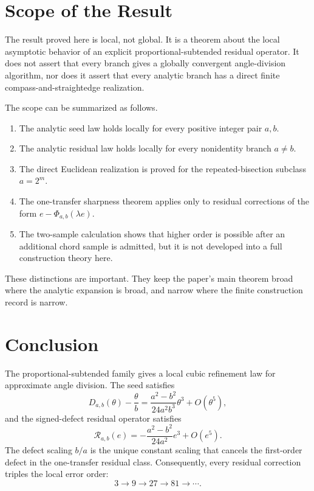 \documentclass[11pt]{article}
\theoremstyle{definition}
\theoremstyle{remark}
\newcommand{\Rop}{\mathscr{R}}
\newcommand{\Phiop}{\Phi}
\begin{document}
\section{Scope of the Result}
\label{sec:scope}

The result proved here is local, not global.  It is a theorem about the local
asymptotic behavior of an explicit proportional-subtended residual operator.
It does not assert that every branch gives a globally convergent angle-division
algorithm, nor does it assert that every analytic branch has a direct finite
compass-and-straightedge realization.

The scope can be summarized as follows.

\begin{enumerate}[label=\arabic*.]
\item The analytic seed law holds locally for every positive integer pair
$a,b$.

\item The analytic residual law holds locally for every nonidentity branch
$a\ne b$.

\item The direct Euclidean realization is proved for the repeated-bisection
subclass $a=2^m$.

\item The one-transfer sharpness theorem applies only to residual corrections
of the form $e-\Phiop_{a,b}(\lambda e)$.

\item The two-sample calculation shows that higher order is possible after an
additional chord sample is admitted, but it is not developed into a full
construction theory here.
\end{enumerate}

These distinctions are important.  They keep the paper's main theorem broad
where the analytic expansion is broad, and narrow where the finite construction
record is narrow.

\section{Conclusion}
\label{sec:conclusion}

The proportional-subtended family gives a local cubic refinement law for
approximate angle division.  The seed satisfies
\[
D_{a,b}(\theta)-\frac{\theta}{b}
=
\frac{a^2-b^2}{24a^2b^3}\theta^3+O(\theta^5),
\]
and the signed-defect residual operator satisfies
\[
\Rop_{a,b}(e)
=
-
\frac{a^2-b^2}{24a^2}e^3+O(e^5).
\]
The defect scaling $b/a$ is the unique constant scaling that cancels the
first-order defect in the one-transfer residual class.  Consequently, every
residual correction triples the local error order:
\[
3\longrightarrow 9\longrightarrow 27\longrightarrow 81\longrightarrow\cdots .
\]
\end{document}
